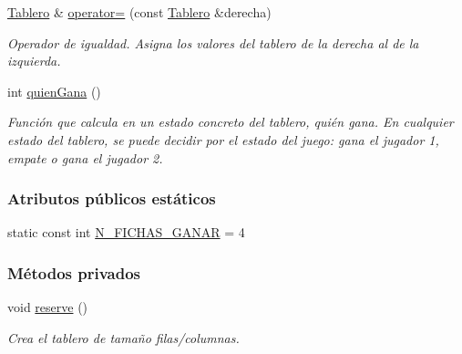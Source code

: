 \begin{DoxyCompactItemize}
\hyperlink{classTablero}{Tablero} \& \hyperlink{classTablero_abd7c6bb5bc26c0500308848399e1fd4f}{operator=} (const \hyperlink{classTablero}{Tablero} \&derecha)
\begin{DoxyCompactList}\small\item\em Operador de igualdad. Asigna los valores del tablero de la derecha al de la izquierda. \end{DoxyCompactList}\item 
int \hyperlink{classTablero_a5de543f8186142731ab3ac77944a11b1}{quien\-Gana} ()
\begin{DoxyCompactList}\small\item\em Función que calcula en un estado concreto del tablero, quién gana. En cualquier estado del tablero, se puede decidir por el estado del juego\-: gana el jugador 1, empate o gana el jugador 2. \end{DoxyCompactList}\end{DoxyCompactItemize}
\subsubsection*{Atributos públicos estáticos}
\begin{DoxyCompactItemize}
\item 
static const int \hyperlink{classTablero_aa38ed353bef45bd6c5a2e3aa4a897720}{N\-\_\-\-F\-I\-C\-H\-A\-S\-\_\-\-G\-A\-N\-A\-R} = 4
\end{DoxyCompactItemize}
\subsubsection*{Métodos privados}
\begin{DoxyCompactItemize}
\item 
void \hyperlink{classTablero_ac2a20883f540c4d010dafab236390cb3}{reserve} ()
\begin{DoxyCompactList}\small\item\em Crea el tablero de tamaño filas/columnas. \end{DoxyCompactList}\end{DoxyCompactItemize}
